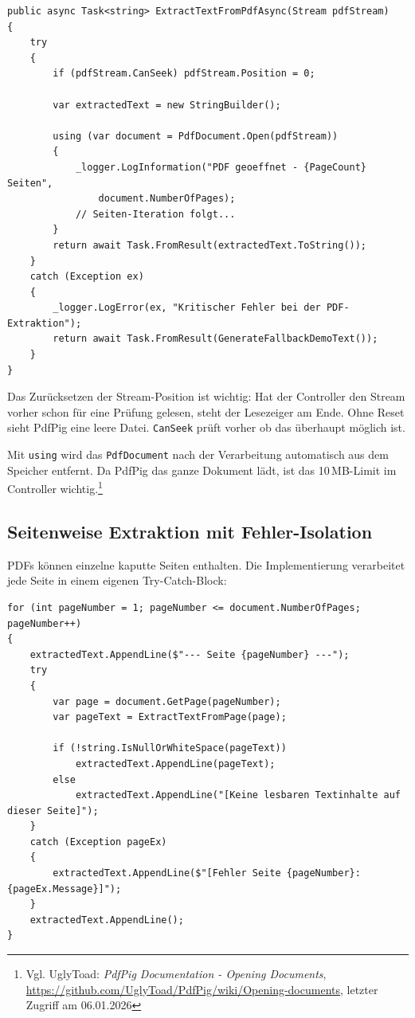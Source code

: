 \begin{lstlisting}[language={[Sharp]C}, caption={PDF Stream-Verarbeitung}, label={lst:pdf_stream}]
public async Task<string> ExtractTextFromPdfAsync(Stream pdfStream)
{
    try
    {
        if (pdfStream.CanSeek) pdfStream.Position = 0;

        var extractedText = new StringBuilder();
        
        using (var document = PdfDocument.Open(pdfStream))
        {
            _logger.LogInformation("PDF geoeffnet - {PageCount} Seiten", 
                document.NumberOfPages);
            // Seiten-Iteration folgt...
        }
        return await Task.FromResult(extractedText.ToString());
    }
    catch (Exception ex)
    {
        _logger.LogError(ex, "Kritischer Fehler bei der PDF-Extraktion");
        return await Task.FromResult(GenerateFallbackDemoText());
    }
}
\end{lstlisting}

Das Zurücksetzen der Stream-Position ist wichtig: Hat der Controller den Stream vorher schon für eine Prüfung gelesen, steht der Lesezeiger am Ende. Ohne Reset sieht PdfPig eine leere Datei. \texttt{CanSeek} prüft vorher ob das überhaupt möglich ist.

Mit \texttt{using} wird das \texttt{PdfDocument} nach der Verarbeitung automatisch aus dem Speicher entfernt. Da PdfPig das ganze Dokument lädt, ist das 10\,MB-Limit im Controller wichtig.\footnote{Vgl. UglyToad: \textit{PdfPig Documentation - Opening Documents}, \url{https://github.com/UglyToad/PdfPig/wiki/Opening-documents}, letzter Zugriff am 06.01.2026}

\subsection{Seitenweise Extraktion mit Fehler-Isolation}

PDFs können einzelne kaputte Seiten enthalten. Die Implementierung verarbeitet jede Seite in einem eigenen Try-Catch-Block:

\begin{lstlisting}[language={[Sharp]C}, caption={Robuste Seiten-Iteration}, label={lst:pdf_page_iteration}]
for (int pageNumber = 1; pageNumber <= document.NumberOfPages; pageNumber++)
{
    extractedText.AppendLine($"--- Seite {pageNumber} ---");
    try
    {
        var page = document.GetPage(pageNumber);
        var pageText = ExtractTextFromPage(page);
        
        if (!string.IsNullOrWhiteSpace(pageText))
            extractedText.AppendLine(pageText);
        else
            extractedText.AppendLine("[Keine lesbaren Textinhalte auf dieser Seite]");
    }
    catch (Exception pageEx)
    {
        extractedText.AppendLine($"[Fehler Seite {pageNumber}: {pageEx.Message}]");
    }
    extractedText.AppendLine();
}
\end{lstlisting}


